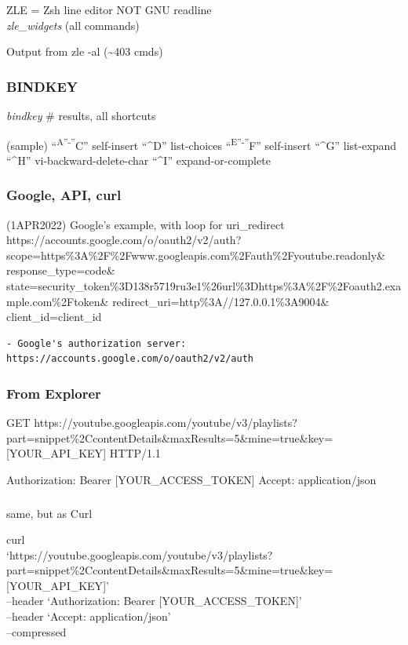 \documentclass[
  letterpaper,
  DIV=11,
  numbers=noendperiod]{scrartcl}
\begin{document}
ZLE = Zsh line editor \textbar{} NOT GNU readline\\
\emph{zle\_widgets} (all commands)

Output from zle -al (\textasciitilde403 cmds)

\subsubsection{BINDKEY}\label{bindkey}

\emph{bindkey} \# results, all shortcuts

(sample) ``\textsuperscript{A''-''}C'' self-insert ``\^{}D''
list-choices ``\textsuperscript{E''-''}F'' self-insert ``\^{}G''
list-expand ``\^{}H'' vi-backward-delete-char ``\^{}I''
expand-or-complete

\subsubsection{Google, API, curl}\label{google-api-curl}

(1APR2022) Google's example, with loop for uri\_redirect
https://accounts.google.com/o/oauth2/v2/auth?
scope=https\%3A\%2F\%2Fwww.googleapis.com\%2Fauth\%2Fyoutube.readonly\&
response\_type=code\&
state=security\_token\%3D138r5719ru3e1\%26url\%3Dhttps\%3A\%2F\%2Foauth2.example.com\%2Ftoken\&
redirect\_uri=http\%3A//127.0.0.1\%3A9004\& client\_id=client\_id

\begin{verbatim}
- Google's authorization server: https://accounts.google.com/o/oauth2/v2/auth
\end{verbatim}

\subsubsection{From Explorer}\label{from-explorer}

GET
https://youtube.googleapis.com/youtube/v3/playlists?part=snippet\%2CcontentDetails\&maxResults=5\&mine=true\&key={[}YOUR\_API\_KEY{]}
HTTP/1.1

Authorization: Bearer {[}YOUR\_ACCESS\_TOKEN{]} Accept: application/json

\subsubsection{}\label{section-2}

same, but as Curl

curl\\
`https://youtube.googleapis.com/youtube/v3/playlists?part=snippet\%2CcontentDetails\&maxResults=5\&mine=true\&key={[}YOUR\_API\_KEY{]}'\\
--header `Authorization: Bearer {[}YOUR\_ACCESS\_TOKEN{]}'\\
--header `Accept: application/json'\\
--compressed
\end{document}
